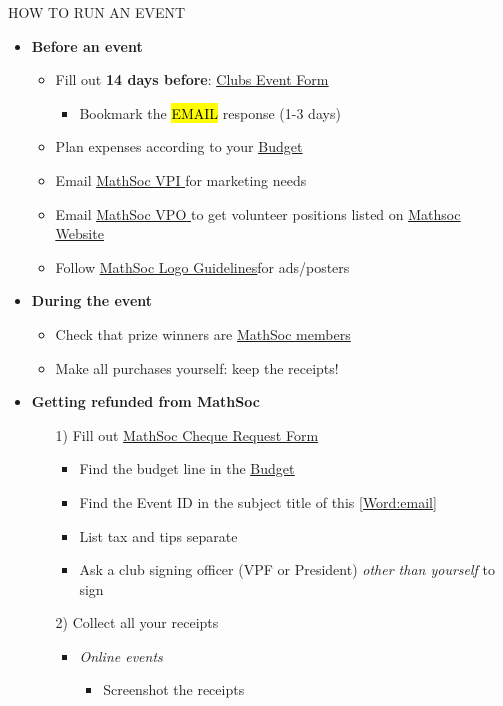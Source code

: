 \documentclass[utf8]{article}
\makeatletter
\newcommand{\setword}[2]{%
  \phantomsection
  #1\def\@currentlabel{\unexpanded{#1}}\label{#2}%
}
\newcommand{\MathSocVPI}{\href{mailto:vpi@mathsoc.uwaterloo.ca}{\underline{MathSoc VPI} }}
\newcommand{\MathSocVPO}{\href{mailto:vpo@mathsoc.uwaterloo.ca}{\underline{MathSoc VPO} }}
\newcommand{\budget}{\href{https://drive.google.com/file/d/1uQIh7Qp33NX0TgJhl3DdY-r2HqZzQKuZ/view}{\underline{Budget} }}
\newcommand{\clubsEventForm}{\href{https://wusa.ca/clubs/clubs-important-forms/clubs-event-form/done?sid=41744&token=1a166c8e45c6113b0322bd3e34fa6fb4}{\underline{Clubs Event Form} }}
\newcommand{\chequeReimbursementForm}{\href{https://mathsoc.uwaterloo.ca/wp-content/uploads/2021/02/Club-Cheque-Request-Form.pdf}{\underline{MathSoc Cheque Request Form} }}
\newcommand{\mathsocsite}{\href{https://mathsoc.uwaterloo.ca/}{\underline{Mathsoc Website}}}
\newcommand{\mathsoclogo}{\href{https://drive.google.com/drive/folders/18v8yaagA74DqMqXaffVm3BGyS8Ze9e5m}{\underline{MathSoc Logo Guidelines}}}
\newcommand{\membership}{\hyperref[sec:membership]{\underline{MathSoc members}}}
\makeatother
\begin{document}
{\Large HOW TO RUN AN EVENT}
\begin{itemize}
    \item \textbf{Before an event}
    \begin{itemize}
        \item Fill out \textbf{14 days before}: \clubsEventForm
        \begin{itemize}
            \item Bookmark the \setword{\hl{EMAIL}}{Word:email} response (1-3 days)
        \end{itemize}
        \item Plan expenses according to your \budget
        \item Email \MathSocVPI for marketing needs
        \item Email \MathSocVPO to get volunteer positions listed on \mathsocsite
        \item Follow \mathsoclogo for ads/posters
    \end{itemize}
    \item \textbf{During the event}
    \begin{itemize}
        \item Check that prize winners are \membership
        \item Make all purchases yourself: keep the receipts!
    \end{itemize}
    \item \textbf{Getting refunded from MathSoc}
    \begin{itemize}
        \item[1)] Fill out \chequeReimbursementForm
        \begin{itemize}
            \item Find the budget line in the \budget 
            \item Find the Event ID in the subject title of this \ref{Word:email}
            \item List tax and tips separate
            \item Ask a club signing officer (VPF or President) \textit{other than yourself} to sign 
        \end{itemize}
        \item[2)] Collect all your receipts
        \begin{itemize}
            \item \textit{Online events}
            \begin{itemize}
                \item Screenshot the receipts

\end{itemize}
\end{itemize}
\end{itemize}
\end{itemize}
\end{document}
